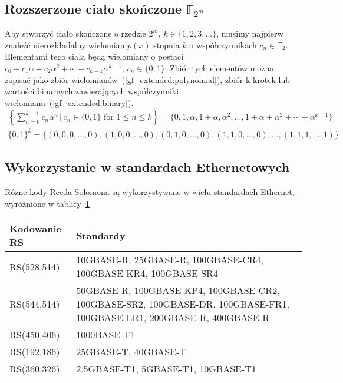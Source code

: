 \subsection{Rozszerzone ciało skończone $\mathbb{F}_{2^m}$}

Aby stworzyć ciało skończone o rzędzie $2^m$, $k \in \{ 1, 2, 3, \ldots \}$, musimy
najpierw znaleźć nierozkładalny wielomian $p(x)$ stopnia $k$ o współczynnikach
$c_{n} \in \mathbb{F}_{2}$.
Elementami tego ciała będą wielomiany o postaci $c_{0} + c_{1}\alpha + c_{2}\alpha^{2} +
    \cdots + c_{k-1}\alpha^{k-1}$, $c_{n} \in \{0, 1\}$.
Zbiór tych elementów można zapisać jako zbiór wielomianów~(\ref{gf_extended:polynomial}),
zbiór k-krotek lub wartości binarnych zawierających współczynniki
wielomianu~(\ref{gf_extended:binary}).
\begin{align}
    \left\{ \sum_{n=0}^{k-1} c_{n}\alpha^{n} \,|\, c_{n} \in \{0,1\} \text{ for } 1 \le n \le k \right\}
        = \{ 0, 1, \alpha, 1 + \alpha, \alpha^{2}, \ldots, 1 + \alpha + \alpha^2 + \cdots + \alpha^{k-1} \}
        \label{gf_extended:polynomial} \\
    \{ 0, 1 \}^{k} = \{ (0, 0, 0, \ldots, 0), (1, 0, 0, \ldots, 0), (0, 1, 0, \ldots, 0),
    (1, 1, 0, \ldots, 0), \ldots, (1, 1, 1, \ldots, 1) \} \label{gf_extended:binary}
\end{align}

\subsection{Wykorzystanie w standardach Ethernetowych}

Różne kody Reeda-Solomona są wykorzystywane w wielu standardach Ethernet,
wyróżnione w tablicy~\ref{standards:title}

\begingroup
{}
\begin{table}[h]
\label{standards:title}
\centering
    \begin{tabular}{m{3cm} m{9cm}}
    \toprule
    Kodowanie RS    & Standardy \\
    \midrule
    RS(528,514)     & 10GBASE-R, 25GBASE-R, 100GBASE-CR4, 100GBASE-KR4, 100GBASE-SR4 \\
    \midrule
    RS(544,514)     & 50GBASE-R, 100GBASE-KP4, 100GBASE-CR2, 100GBASE-SR2, 100GBASE-DR, 100GBASE-FR1, 100GBASE-LR1, \hfill 200GBASE-R, \hfill 400GBASE-R \\
    \midrule
    RS(450,406)     & 1000BASE-T1 \\
    \midrule
    RS(192,186)     & 25GBASE-T, \;\;\;\;\;\;\;\;\;\;\;\;\; 40GBASE-T \\
    \midrule
    RS(360,326)     & 2.5GBASE-T1, \hfill 5GBASE-T1, \hfill 10GBASE-T1 \\
    \bottomrule
    \end{tabular}
\end{table}
\endgroup

